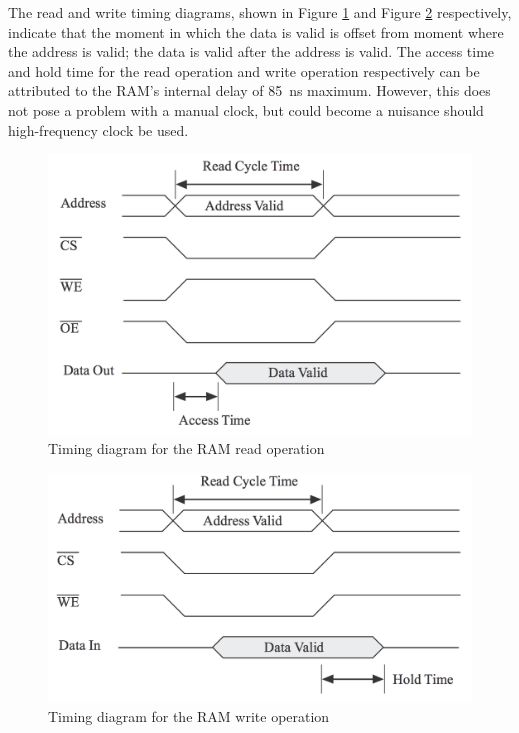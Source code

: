 \documentclass[11pt]{article}
\begin{document}
The read and write timing diagrams, shown in Figure \ref{fig:read-timing} and Figure \ref{fig:write-timing} respectively, indicate that the moment in which the data is valid is offset from moment where the address is valid; the data is valid after the address is valid. The access time and hold time for the read operation and write operation respectively can be attributed to the RAM's internal delay of \SI{85}{\nano\second} maximum. However, this does not pose a problem with a manual clock, but could become a nuisance should high-frequency clock be used.

\begin{figure}[htpb]
	\centering
	\includegraphics[scale=0.5]{read}
	\caption{Timing diagram for the RAM read operation}
	\label{fig:read-timing}
\end{figure}

\begin{figure}[htpb]
	\centering
	\includegraphics[scale=0.5]{write}
	\caption{Timing diagram for the RAM write operation}
	\label{fig:write-timing}
\end{figure}
\end{document}
